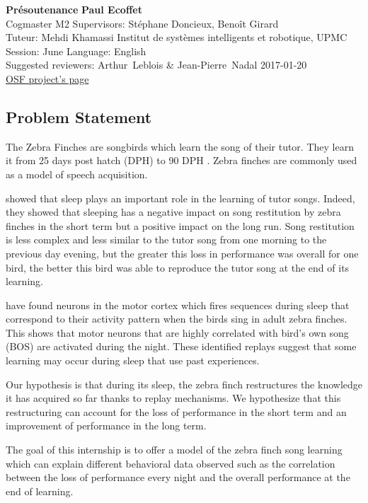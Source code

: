 \documentclass[a4paper]{article}
\begin{document}
\noindent
\large\textbf{Présoutenance} \hfill \textbf{Paul Ecoffet} \\
\normalsize Cogmaster M2 \hfill Supervisors: Stéphane Doncieux, Benoît Girard \\
Tuteur: Mehdi Khamassi \hfill Institut de systèmes intelligents et robotique, UPMC\\
Session: June \hfill Language: English\\
Suggested reviewers: Arthur~Leblois \& Jean-Pierre~Nadal \hfill 2017-01-20\\
\href{https://osf.io/ja8k9/}{OSF project's page}
\begin{multicols}{2}
\section*{Problem Statement}

The Zebra Finches are songbirds which learn the song of their tutor. They learn
it from 25 days post hatch (DPH) to 90 DPH \parencite{liu_juvenile_2004}. Zebra
finches are commonly used as a model of speech acquisition.

\textcite{deregnaucourt_how_2005} showed that sleep plays an important role in
the learning of tutor songs. Indeed, they showed that sleeping has a negative
impact on song restitution by zebra finches in the short term but a positive
impact on the long run. Song restitution is less complex and less similar to the
tutor song from one morning to the previous day evening, but the greater this
loss in performance was overall for one bird, the better this bird was able to
reproduce the tutor song at the end of its learning.


\textcite{dave_song_2000} have found neurons in the motor cortex which fires
sequences during sleep that correspond to their activity pattern when the birds
sing in adult zebra finches. This shows that motor neurons that are highly
correlated with bird's own song (BOS) are activated during the night. These
identified replays suggest that some learning may occur during sleep that use
past experiences.

Our hypothesis is that during its sleep, the zebra finch restructures the
knowledge it has acquired so far thanks to replay mechanisms. We hypothesize
that this restructuring can account for the loss of performance in the short
term and an improvement of performance in the long term.

The goal of this internship is to offer a model of the zebra finch song
learning which can explain different behavioral data observed such as the
correlation between the loss of performance every night and the overall
performance at the end of learning.


\end{multicols}
\end{document}
